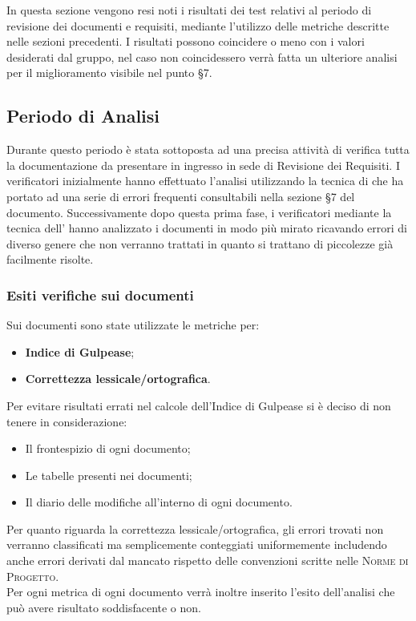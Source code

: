 \documentclass[../piano-di-qualifica.tex]{subfiles}
\begin{document}
In questa sezione vengono resi noti i risultati dei test relativi al periodo di revisione dei documenti e requisiti, mediante l'utilizzo delle metriche descritte nelle sezioni precedenti.
I risultati possono coincidere o meno con i valori desiderati dal gruppo, nel caso non coincidessero verrà fatta un ulteriore analisi per il miglioramento visibile nel punto §7.

\subsection{Periodo di Analisi}
\label{sub:periodo_di_analisi}
Durante questo periodo è stata sottoposta ad una precisa attività di verifica tutta la documentazione da presentare in ingresso in sede di Revisione dei Requisiti.
I verificatori inizialmente hanno effettuato l'analisi utilizzando la tecnica di  che ha portato ad una serie di errori frequenti consultabili nella sezione §7 del documento.
Successivamente dopo questa prima fase, i verificatori mediante la tecnica dell' hanno analizzato i documenti in modo più mirato ricavando errori di diverso genere che non verranno trattati in quanto si trattano di piccolezze già facilmente risolte.

\subsubsection{Esiti verifiche sui documenti}
\label{sub:esiti_verifiche_sui_documenti}
Sui documenti sono state utilizzate le metriche per:
    \begin{itemize}
        \item \textbf{Indice di Gulpease};
        \item \textbf{Correttezza lessicale/ortografica}.
    \end{itemize}
Per evitare risultati errati nel calcole dell'Indice di Gulpease si è deciso di non tenere in considerazione:
    \begin{itemize}
        \item Il frontespizio di ogni documento;
        \item Le tabelle presenti nei documenti;
        \item Il diario delle modifiche all'interno di ogni documento.
    \end{itemize}
Per quanto riguarda la correttezza lessicale/ortografica, gli errori trovati non verranno classificati ma semplicemente conteggiati uniformemente includendo anche errori derivati dal mancato rispetto delle convenzioni scritte nelle \textsc{Norme di Progetto}.
\\ Per ogni metrica di ogni documento verrà inoltre inserito l'esito dell'analisi che può avere risultato soddisfacente o non.
\end{document}
